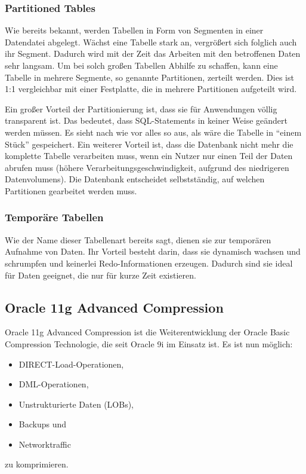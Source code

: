         \subsubsection{Partitioned Tables}
          Wie bereits bekannt, werden Tabellen in Form von Segmenten in einer
          Datendatei abgelegt. W\"achst eine Tabelle stark an, vergr\"o\ss{}ert
          sich folglich auch ihr Segment. Dadurch wird mit der Zeit das Arbeiten
          mit den betroffenen Daten sehr langsam. Um bei solch gro\ss{}en
          Tabellen Abhilfe zu schaffen, kann eine Tabelle in mehrere Segmente,
          so genannte Partitionen, zerteilt werden. Dies ist 1:1 vergleichbar
          mit einer Festplatte, die in mehrere Partitionen aufgeteilt wird.

          Ein gro\ss{}er Vorteil der Partitionierung ist, dass sie f\"ur
          Anwendungen v\"ollig transparent ist. Das bedeutet, dass
          SQL-Statements in keiner Weise ge\"andert werden m\"ussen. Es sieht
          nach wie vor alles so aus, als w\"are die Tabelle in \enquote{einem
          St\"uck} gespeichert. Ein weiterer Vorteil ist, dass die Datenbank
          nicht mehr die komplette Tabelle verarbeiten muss, wenn ein Nutzer nur
          einen Teil der Daten abrufen muss (h\"ohere
          Verarbeitungsgeschwindigkeit, aufgrund des niedrigeren Datenvolumens).
          Die Datenbank entscheidet selbstst\"andig, auf welchen Partitionen
          gearbeitet werden muss.
        \subsubsection{Tempor\"are Tabellen}
          Wie der Name dieser Tabellenart bereits sagt, dienen sie zur tempor\"aren Aufnahme von Daten. Ihr Vorteil besteht darin, dass sie dynamisch wachsen und schrumpfen und keinerlei Redo-Informationen erzeugen. Dadurch sind sie ideal f\"ur Daten geeignet, die nur f\"ur kurze Zeit existieren.
      \subsection{Oracle 11g Advanced Compression}
        Oracle 11g Advanced Compression ist die Weiterentwicklung der Oracle Basic Compression Technologie, die seit Oracle 9i im Einsatz ist. Es ist nun m\"oglich:
        \begin{itemize}
          \item DIRECT-Load-Operationen,
          \item DML-Operationen,
          \item Unstrukturierte Daten (LOBs),
          \item Backups und
          \item Networktraffic
        \end{itemize}
        zu komprimieren.

